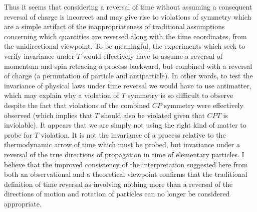 \documentclass[notitlepage,12pt]{report}
\begin{document}
Thus it seems that considering a reversal of time without assuming a consequent reversal of charge is incorrect and may give rise to violations of symmetry which are a simple artifact of the inappropriateness of traditional assumptions concerning which quantities are reversed along with the time coordinates, from the unidirectional viewpoint. To be meaningful, the experiments which seek to verify invariance under $T$ would effectively have to assume a reversal of momentum and spin retracing a process backward, but combined with a reversal of charge (a permutation of particle and antiparticle). In other words, to test the invariance of physical laws under time reversal we would have to use antimatter, which may explain why a violation of $T$ symmetry is so difficult to observe despite the fact that violations of the combined $CP$ symmetry were effectively observed (which implies that $T$ should also be violated given that $CPT$ is inviolable). It appears that we are simply not using the right kind of matter to probe for $T$ violation. It is not the invariance of a process relative to the thermodynamic arrow of time which must be probed, but invariance under a reversal of the true directions of propagation in time of elementary particles. I believe that the improved consistency of the interpretation suggested here from both an observational and a theoretical viewpoint confirms that the traditional definition of time reversal as involving nothing more than a reversal of the directions of motion and rotation of particles can no longer be considered appropriate.
\end{document}
